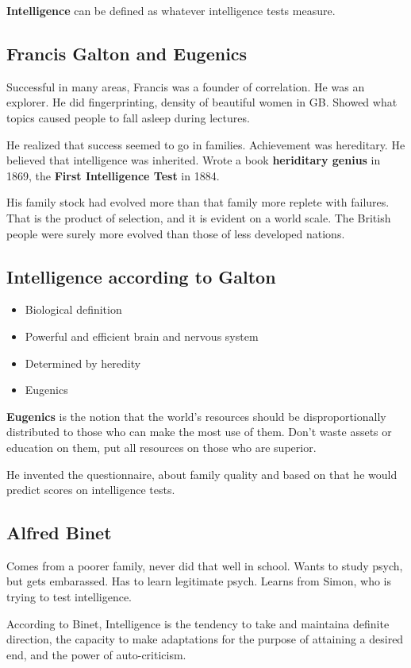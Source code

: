 \documentclass[12pt]{article}
\begin{document}
\textbf{Intelligence} can be defined as whatever intelligence tests measure. 
\subsection*{Francis Galton and Eugenics}
Successful in many areas, Francis was a founder of correlation. He was an explorer. He did fingerprinting, density of beautiful women in GB. Showed what topics caused people to fall asleep during lectures. 

He realized that success seemed to go in families. Achievement was hereditary. He believed that intelligence was inherited. Wrote a book \textbf{heriditary genius} in 1869, the \textbf{First Intelligence Test} in 1884.

His family stock had evolved more than that family more replete with failures. That is the product of selection, and it is evident on a world scale. The British people were surely more evolved than those of less developed nations. 

\subsection*{Intelligence according to Galton}
\begin{itemize}
  \item Biological definition
  \item Powerful and efficient brain and nervous system
  \item Determined by heredity
  \item Eugenics
\end{itemize}
\textbf{Eugenics }is the notion that the world's resources should be disproportionally distributed to those who can make the most use of them. Don't waste assets or education on them, put all resources on those who are superior. 

He invented the questionnaire, about family quality and based on that he would predict scores on intelligence tests.

\subsection*{Alfred Binet}
Comes from a poorer family, never did that well in school. Wants to study psych, but gets embarassed. Has to learn legitimate psych. Learns from Simon, who is trying to test intelligence. 

According to Binet, Intelligence is the tendency to take and maintaina  definite direction, the capacity to make adaptations for the purpose of attaining a desired end, and the power of auto-criticism.
\end{document}
